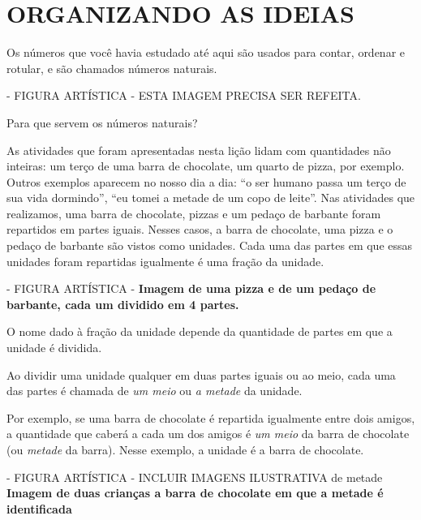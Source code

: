 \documentclass[a4,12pt]{book}
\begin{document}

\section{ ORGANIZANDO AS IDEIAS }


  


Os números que você havia estudado até aqui são usados para contar, ordenar e rotular, e são chamados números naturais.
\begin{imagem*}[breakable]{}{}   - FIGURA ARTÍSTICA - ESTA IMAGEM PRECISA SER REFEITA.  
\end{imagem*}

Para que servem os números naturais?

As atividades que foram apresentadas nesta lição lidam com quantidades não inteiras: um terço de uma barra de chocolate, um quarto de pizza, por exemplo. 
Outros exemplos aparecem no nosso dia a dia: ``o ser humano passa um terço de sua vida dormindo'', ``eu tomei a metade de um copo de leite''. 
Nas atividades que realizamos, uma barra de chocolate, pizzas e um pedaço de barbante foram repartidos em partes iguais. 
Nesses casos, a barra de chocolate, uma pizza e o pedaço de barbante são vistos como unidades. 
Cada uma das partes em que essas unidades foram repartidas igualmente é uma fração da unidade.

\begin{imagem*}[breakable]{}{}   - FIGURA ARTÍSTICA -  
  {\bf Imagem de uma pizza e de um pedaço de barbante, cada um dividido em 4 partes.}  
\end{imagem*}

O nome dado à fração da unidade depende da quantidade de partes em que a unidade é dividida. 

Ao dividir uma unidade qualquer em duas partes iguais ou ao meio, cada uma das partes é chamada de {\it um meio} ou {\it a metade} da unidade. 

Por exemplo, se uma barra de chocolate é repartida igualmente entre dois amigos, a quantidade que caberá a cada um dos amigos é {\it um meio} da barra de chocolate (ou {\it metade} da barra). Nesse exemplo, a unidade é a barra de chocolate.

\begin{imagem*}[breakable]{}{}   - FIGURA ARTÍSTICA - INCLUIR IMAGENS ILUSTRATIVA de metade   
  {\bf Imagem de duas crianças a barra de chocolate em que a metade é identificada}  
\end{imagem*}
\end{document}
